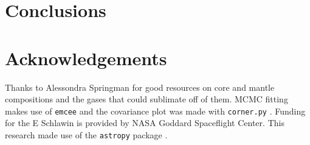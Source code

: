 \documentclass[preprint]{aastex61}
\begin{document}
\section{Conclusions}\label{sec:conclusions}

\section{Acknowledgements}
Thanks to Alessondra Springman for good resources on core and mantle compositions and the gases that could sublimate off of them.
MCMC fitting makes use of \texttt{emcee} \citep{foreman-mackey2013emcee} and the covariance plot was made with \texttt{corner.py} \citep{foremanCorner}.
Funding for the E Schlawin is provided by NASA Goddard Spaceflight Center.
This research made use of the \texttt{astropy} package \citep{astropy2013}.






\end{document}
